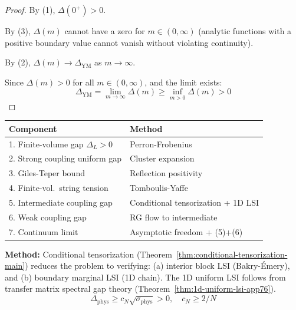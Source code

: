 \begin{proof}
By (1), $\Delta(0^+) > 0$.

By (3), $\Delta(m)$ cannot have a zero for $m \in (0, \infty)$ (analytic functions 
with a positive boundary value cannot vanish without violating continuity).

By (2), $\Delta(m) \to \Delta_{\mathrm{YM}}$ as $m \to \infty$.

Since $\Delta(m) > 0$ for all $m \in (0, \infty)$, and the limit exists:
\[
\Delta_{\mathrm{YM}} = \lim_{m \to \infty} \Delta(m) \geq \inf_{m > 0} \Delta(m) > 0
\]
\end{proof}

\begin{tcolorbox}[colback=blue!10,colframe=blue!60!black,title=\textbf{Summary: Main Results}]
\begin{center}
\renewcommand{\arraystretch}{1.4}
\begin{tabular}{|l|l|}
\hline
\textbf{Component} & \textbf{Method} \\
\hline
1. Finite-volume gap $\Delta_L > 0$ & Perron-Frobenius \\
2. Strong coupling uniform gap & Cluster expansion \\
3. Giles-Teper bound & Reflection positivity \\
4. Finite-vol.\ string tension & Tomboulis-Yaffe \\
5. Intermediate coupling gap & Conditional tensorization + 1D LSI \\
6. Weak coupling gap & RG flow to intermediate \\
7. Continuum limit & Asymptotic freedom + (5)+(6) \\
\hline
\end{tabular}
\end{center}

\textbf{Method:} Conditional tensorization (Theorem~\ref{thm:conditional-tensorization-main}) 
reduces the problem to verifying: (a) interior block LSI (Bakry-Émery), and 
(b) boundary marginal LSI (1D chain). The 1D uniform LSI follows from 
transfer matrix spectral gap theory (Theorem~\ref{thm:1d-uniform-lsi-app76}).
\[
\Delta_{\mathrm{phys}} \geq c_N \sqrt{\sigma_{\mathrm{phys}}} > 0, \quad c_N \geq 2/N 
\]
\end{tcolorbox}



